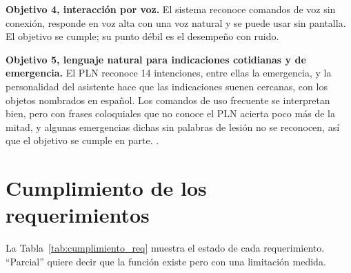 \textbf{Objetivo 4, interacción por voz.} El sistema reconoce comandos de voz sin
conexión, responde en voz alta con una voz natural y se puede usar sin pantalla. El
objetivo se cumple; su punto débil es el desempeño con ruido.

\textbf{Objetivo 5, lenguaje natural para indicaciones cotidianas y de emergencia.}
El PLN reconoce 14 intenciones, entre ellas la emergencia, y la personalidad del
asistente hace que las indicaciones suenen cercanas, con los objetos nombrados en
español. Los comandos de uso frecuente se interpretan bien, pero con frases coloquiales
que no conoce el PLN acierta poco más de la mitad, y algunas emergencias dichas sin
palabras de lesión no se reconocen, así que el objetivo se cumple en parte. .

\section{Cumplimiento de los requerimientos}

La Tabla~\ref{tab:cumplimiento_req} muestra el estado de cada requerimiento. ``Parcial''
quiere decir que la función existe pero con una limitación medida.

